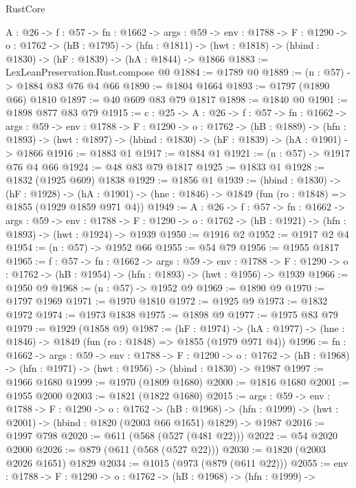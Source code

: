 \begin{lexlean}{RustCore}
\begin{coremodule}
  {A : @26} ->
  {f : @57} ->
  {fn : @1662} ->
  {args : @59} ->
  {env : @1788} ->
  {F : @1290} ->
  {o : @1762} ->
  (hB : @1795) ->
  (hfn : @1811) -> (hwt : @1818) -> (hbind : @1830) -> (hF : @1839) -> (hA : @1844) -> @1866
@1883 := LexLeanPreservation.Rust.compose @0
@1884 := @1789 @0
@1889 := (n : @57) -> @1884 @83 @76 @4 @66
@1890 := @1804 @1664
@1893 := @1797 (@1890 @66) @1810
@1897 := @40 @609 @83 @79 @1817
@1898 := @1840 @0
@1901 := @1898 @877 @83 @79
@1915 := {c : @25} ->
  {A : @26} ->
  {f : @57} ->
  {fn : @1662} ->
  {args : @59} ->
  {env : @1788} ->
  {F : @1290} ->
  {o : @1762} ->
  (hB : @1889) ->
  (hfn : @1893) -> (hwt : @1897) -> (hbind : @1830) -> (hF : @1839) -> (hA : @1901) -> @1866
@1916 := @1883 @1
@1917 := @1884 @1
@1921 := (n : @57) -> @1917 @76 @4 @66
@1924 := @48 @83 @79 @1817
@1925 := @1833 @1
@1928 := @1832 (@1925 @609) @1838
@1929 := @1856 @1
@1939 := (hbind : @1830) ->
  (hF : @1928) ->
  (hA : @1901) -> (hne : @1846) -> @1849 (fun (ro : @1848) => @1855 (@1929 @1859 @971 @4))
@1949 := {A : @26} ->
  {f : @57} ->
  {fn : @1662} ->
  {args : @59} ->
  {env : @1788} ->
  {F : @1290} -> {o : @1762} -> (hB : @1921) -> (hfn : @1893) -> (hwt : @1924) -> @1939
@1950 := @1916 @2
@1952 := @1917 @2 @4
@1954 := (n : @57) -> @1952 @66
@1955 := @54 @79
@1956 := @1955 @1817
@1965 := {f : @57} ->
  {fn : @1662} ->
  {args : @59} ->
  {env : @1788} ->
  {F : @1290} -> {o : @1762} -> (hB : @1954) -> (hfn : @1893) -> (hwt : @1956) -> @1939
@1966 := @1950 @9
@1968 := (n : @57) -> @1952 @9
@1969 := @1890 @9
@1970 := @1797 @1969
@1971 := @1970 @1810
@1972 := @1925 @9
@1973 := @1832 @1972
@1974 := @1973 @1838
@1975 := @1898 @9
@1977 := @1975 @83 @79
@1979 := @1929 (@1858 @9)
@1987 := (hF : @1974) ->
  (hA : @1977) -> (hne : @1846) -> @1849 (fun (ro : @1848) => @1855 (@1979 @971 @4))
@1996 := {fn : @1662} ->
  {args : @59} ->
  {env : @1788} ->
  {F : @1290} ->
  {o : @1762} -> (hB : @1968) -> (hfn : @1971) -> (hwt : @1956) -> (hbind : @1830) -> @1987
@1997 := @1966 @1680
@1999 := @1970 (@1809 @1680)
@2000 := @1816 @1680
@2001 := @1955 @2000
@2003 := @1821 (@1822 @1680)
@2015 := {args : @59} ->
  {env : @1788} ->
  {F : @1290} ->
  {o : @1762} ->
  (hB : @1968) -> (hfn : @1999) -> (hwt : @2001) -> (hbind : @1820 (@2003 @66 @1651) @1829) -> @1987
@2016 := @1997 @798
@2020 := @611 (@568 (@527 (@481 @22)))
@2022 := @54 @2020 @2000
@2026 := @879 (@611 (@568 (@527 @22)))
@2030 := @1820 (@2003 @2026 @1651) @1829
@2034 := @1015 (@973 (@879 (@611 @22)))
@2055 := {env : @1788} ->
  {F : @1290} ->
  {o : @1762} ->
  (hB : @1968) ->
  (hfn : @1999) ->

\end{coremodule}
\end{lexlean}
